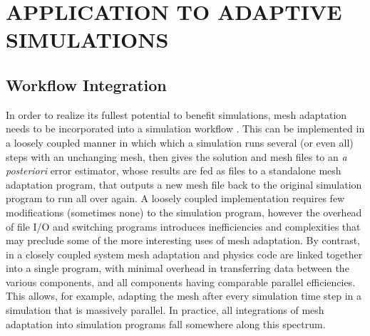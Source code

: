 
\chapter{APPLICATION TO ADAPTIVE SIMULATIONS}
\label{chap:apps}
\nocite{ibanez2016pumi}
\nocite{ibanez2017modifiable}

\section{Workflow Integration}

In order to realize its fullest potential to benefit
simulations, mesh adaptation needs to be incorporated
into a simulation workflow \cite{smith2016building}.
This can be implemented in a loosely coupled manner in which
which a simulation runs several (or even all) steps with
an unchanging mesh, then gives the solution and mesh
files to an {\it a posteriori} error estimator, whose results
are fed as files to a standalone mesh adaptation program, that
outputs a new mesh file back to the original simulation program
to run all over again.
A loosely coupled implementation
requires few modifications (sometimes none) to the simulation program,
however the overhead of file I/O and switching programs introduces
inefficiencies and complexities that may preclude some of the more
interesting uses of mesh adaptation.
By contrast, in a closely coupled system mesh adaptation
and physics code are linked together into a single program,
with minimal overhead in transferring data between the various
components, and all components having comparable parallel efficiencies.
This allows, for example, adapting the mesh after every simulation
time step in a simulation that is massively parallel.
In practice, all integrations of mesh adaptation into simulation programs
fall somewhere along this spectrum.

